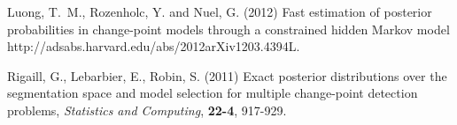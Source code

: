 \documentclass{bioinfo}
\begin{document}
\begin{methods}
\begin{thebibliography}{}
 Luong, T.~M., Rozenholc, Y. and Nuel, G. (2012) Fast estimation of posterior probabilities in change-point models through a constrained hidden Markov model {http://adsabs.harvard.edu/abs/2012arXiv1203.4394L}.

 Rigaill, G., Lebarbier, E., Robin, S. (2011) Exact posterior distributions over the segmentation space and model selection for multiple change-point detection problems, {\it Statistics and Computing}, {\bf 22-4}, 917-929.

\end{thebibliography}
\end{methods}
\end{document}
